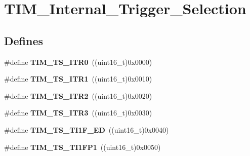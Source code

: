 \hypertarget{group__TIM__Internal__Trigger__Selection}{
\section{TIM\_\-Internal\_\-Trigger\_\-Selection}
\label{group__TIM__Internal__Trigger__Selection}
}
\subsection*{Defines}
\begin{DoxyCompactItemize}
\item 
\hypertarget{group__TIM__Internal__Trigger__Selection_gab7cf2b7db3956d4fd1e5a5d84f4891e7}{
\#define {\bfseries TIM\_\-TS\_\-ITR0}~((uint16\_\-t)0x0000)}
\label{group__TIM__Internal__Trigger__Selection_gab7cf2b7db3956d4fd1e5a5d84f4891e7}

\item 
\hypertarget{group__TIM__Internal__Trigger__Selection_gad90fbca297153ca9c0112a67ea2c6cb3}{
\#define {\bfseries TIM\_\-TS\_\-ITR1}~((uint16\_\-t)0x0010)}
\label{group__TIM__Internal__Trigger__Selection_gad90fbca297153ca9c0112a67ea2c6cb3}

\item 
\hypertarget{group__TIM__Internal__Trigger__Selection_ga8599ba58a5f911d648503c7ac55d4320}{
\#define {\bfseries TIM\_\-TS\_\-ITR2}~((uint16\_\-t)0x0020)}
\label{group__TIM__Internal__Trigger__Selection_ga8599ba58a5f911d648503c7ac55d4320}

\item 
\hypertarget{group__TIM__Internal__Trigger__Selection_ga63183e611b91c5847040172c0069514d}{
\#define {\bfseries TIM\_\-TS\_\-ITR3}~((uint16\_\-t)0x0030)}
\label{group__TIM__Internal__Trigger__Selection_ga63183e611b91c5847040172c0069514d}

\item 
\hypertarget{group__TIM__Internal__Trigger__Selection_ga8c89554efc693e679c94b5a749af123c}{
\#define {\bfseries TIM\_\-TS\_\-TI1F\_\-ED}~((uint16\_\-t)0x0040)}
\label{group__TIM__Internal__Trigger__Selection_ga8c89554efc693e679c94b5a749af123c}

\item 
\hypertarget{group__TIM__Internal__Trigger__Selection_ga38d3514d54bcdb0ea8ac8bd91c5832b5}{
\#define {\bfseries TIM\_\-TS\_\-TI1FP1}~((uint16\_\-t)0x0050)}
\label{group__TIM__Internal__Trigger__Selection_ga38d3514d54bcdb0ea8ac8bd91c5832b5}


\end{DoxyCompactItemize}
